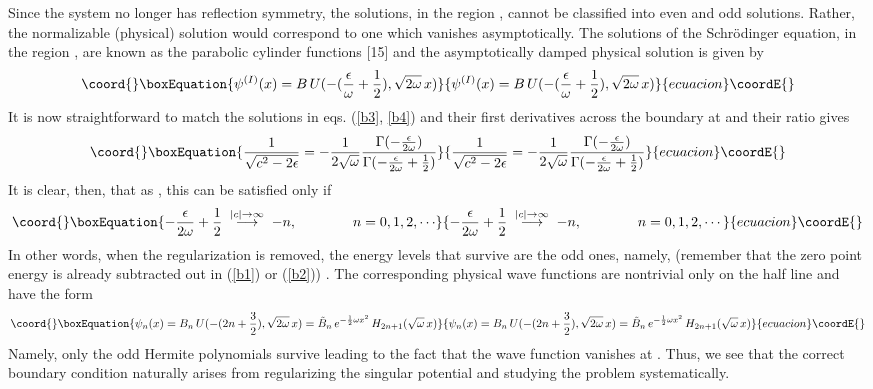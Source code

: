 \documentclass[a4paper,11pt]{article}
\begin{document}
Since the system no longer has reflection symmetry, the solutions, in
the region \coordHE{},
cannot be classified into even and odd solutions. Rather, the
normalizable (physical)
solution would correspond to one which vanishes asymptotically. The
solutions of the Schr\"{o}dinger equation, in the region \coordHE{}, are
known as the parabolic cylinder functions [15] and the asymptotically
damped physical solution is given by
\begin{equation}\coord{}\boxEquation{
\psi^{(I)}(x) = B\,U(-({\epsilon\over\omega}+{1\over 2}),
\sqrt{2\omega}\,x)\label{b4} 
}{
\psi^{(I)}(x) = B\,U(-({\epsilon\over\omega}+{1\over 2}),
\sqrt{2\omega}\,x)}{ecuacion}\coordE{}\end{equation}
It is now straightforward to match the solutions in eqs. (\ref{b3},
\ref{b4}) and their first derivatives across the boundary at \coordHE{} and
their ratio gives
\begin{equation}\coord{}\boxEquation{
\frac{1}{\sqrt{c^{2}-2\epsilon}} =
-\frac{1}{2\sqrt{\omega}}\frac{\Gamma(-{\epsilon\over
2\omega})}{\Gamma(-{\epsilon\over 2\omega}+{1\over 2})}\label{b6}
}{
\frac{1}{\sqrt{c^{2}-2\epsilon}} =
-\frac{1}{2\sqrt{\omega}}\frac{\Gamma(-{\epsilon\over
2\omega})}{\Gamma(-{\epsilon\over 2\omega}+{1\over 2})}}{ecuacion}\coordE{}\end{equation}
It is clear, then, that as \coordHE{}, this can be
satisfied only if
\begin{equation}\coord{}\boxEquation{
-{\epsilon\over 2\omega} + {1\over 2}\;
 \stackrel{|c|\rightarrow\infty}{\longrightarrow}\; -n,\qquad\qquad
 n=0,1,2,\cdots\label{b7} 
}{
-{\epsilon\over 2\omega} + {1\over 2}\;
 \stackrel{|c|\rightarrow\infty}{\longrightarrow}\; -n,\qquad\qquad
 n=0,1,2,\cdots}{ecuacion}\coordE{}\end{equation}
In other words, when the regularization is removed, the energy levels
that survive are the odd ones, namely, (remember that the zero point
energy is already subtracted out in (\ref{b1}) or (\ref{b2}))
\coordHE{}.
The corresponding physical wave functions are nontrivial only on the half
line \coordHE{} and have the form
\begin{equation}\coord{}\boxEquation{
\psi_{n}(x) = B_{n}\,U(-(2n+{3\over 2}), \sqrt{2\omega}\,x) =
\tilde{B}_{n}\,e^{-{1\over 2}\omega
x^{2}}\,H_{2n+1}(\sqrt{\omega}\,x)\label{b9}
}{
\psi_{n}(x) = B_{n}\,U(-(2n+{3\over 2}), \sqrt{2\omega}\,x) =
\tilde{B}_{n}\,e^{-{1\over 2}\omega
x^{2}}\,H_{2n+1}(\sqrt{\omega}\,x)}{ecuacion}\coordE{}\end{equation}
Namely, only the odd Hermite polynomials survive leading to the fact
that the wave function vanishes at \coordHE{}. Thus, we see that the
correct boundary condition naturally arises from regularizing the
singular potential and studying the problem systematically.
\end{document}

